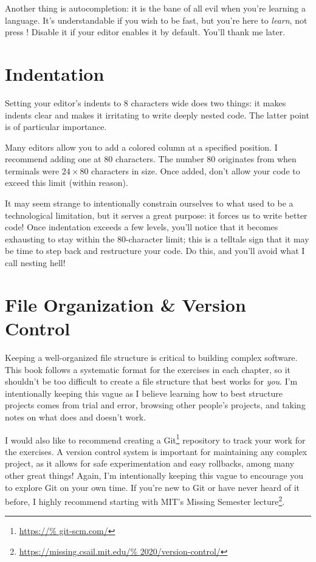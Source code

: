 Another thing is autocompletion: it is the bane of all evil when you're
learning a language.  It's understandable if you wish to be fast, but
you're here to \emph{learn}, not press !  Disable it if your
editor enables it by default.  You'll thank me later.

\section{Indentation}

Setting your editor's indents to 8 characters wide does two things: it
makes indents clear and makes it irritating to write deeply nested code.
The latter point is of particular importance.

Many editors allow you to add a colored column at a specified position.
I recommend adding one at 80 characters.  The number 80 originates from
when terminals were \(24 \times 80\) characters in size.  Once added,
don't allow your code to exceed this limit (within reason).

It may seem strange to intentionally constrain ourselves to what used to
be a technological limitation, but it serves a great purpose: it forces
us to write better code!  Once indentation exceeds a few levels, you'll
notice that it becomes exhausting to stay within the 80-character limit;
this is a telltale sign that it may be time to step back and restructure
your code.  Do this, and you'll avoid what I call nesting hell!

\section{File Organization \& Version Control}

Keeping a well-organized file structure is critical to building complex
software.  This book follows a systematic format for the exercises in
each chapter, so it shouldn't be too difficult to create a file
structure that best works for \emph{you}.  I'm intentionally keeping
this vague as I believe learning how to best structure projects comes
from trial and error, browsing other people's projects, and taking notes
on what does and doesn't work.

I would also like to recommend creating a Git\footnote{\url{https://%
git-scm.com/}} repository to track your work for the exercises.  A
version control system is important for maintaining any complex project,
as it allows for safe experimentation and easy rollbacks, among many
other great things!  Again, I'm intentionally keeping this vague to
encourage you to explore Git on your own time.  If you're new to Git or
have never heard of it before, I highly recommend starting with MIT's
Missing Semester lecture\footnote{\url{https://missing.csail.mit.edu/%
2020/version-control/}}.

